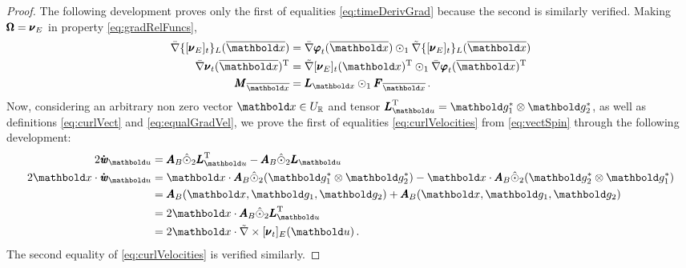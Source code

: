 {\footnotesize
\begin{proof}
The following development proves only the first of equalities \eqref{eq:timeDerivGrad} because the second is similarly verified. Making $\pmb{\Omega}=\pmb{\nu}_E$ in property \eqref{eq:gradRelFuncs}, 
\begin{align*}
\bar{\nabla}\{[{\tnr{\nu}_E}]_{t}\}_L(\overline{\vto{x}})&=\bar{\nabla}{\tnr{\varphi}}_{t}(\overline{\vto{x}})\odot_1\tilde{\nabla}\{[{\tnr{\nu}_E}]_{t}\}_L(\overline{\vto{x}})\\
\bar{\nabla}{\tnr{\nu}}_{t}(\overline{\vto{x}})^\text{T}&=\tilde{\nabla}[\tnr{\nu}_E]_{t}({\vto{x}})^\text{T}\odot_1\bar{\nabla}{\tnr{\varphi}}_{t}(\overline{\vto{x}})^\text{T}\\
\tnr{M}_{\overline{\vto{x}}}&=\tnr{L}_{{\vto{x}}}\odot_1\tnr{F}_{\overline{\vto{x}}}\,.
\end{align*}
Now, considering an arbitrary non zero vector $\vto{x}\in U_\real$ and tensor ${\tnr{L}}_{{\vto{u}}}^{\text{T}}=\vto{g}_1^*\otimes\vto{g}_2^*$, as well as definitions \eqref{eq:curlVect} and \eqref{eq:equalGradVel}, we prove the first of equalities \eqref{eq:curlVelocities} from \eqref{eq:vectSpin} through the following development:
\begin{align*}
2\tnr{\dot{\mathit{w}}}_{{\vto{u}}} &=\tnr{A}_B\hat{\odot}_2{\tnr{L}}_{{\vto{u}}}^{\text{T}}-\tnr{A}_B\hat{\odot}_2{\tnr{L}}_{{\vto{u}}}\\
2\vto{x}\cdot\tnr{\dot{\mathit{w}}}_{{\vto{u}}}&=\vto{x}\cdot\tnr{A}_B\hat{\odot}_2(\vto{g}_1^*\otimes\vto{g}_2^*) - \vto{x}\cdot\tnr{A}_B\hat{\odot}_2(\vto{g}_2^*\otimes\vto{g}_1^*)\\
&=\tnr{A}_B(\vto{x},\vto{g}_1,\vto{g}_2) + \tnr{A}_B(\vto{x},\vto{g}_1,\vto{g}_2)\\
&=2\vto{x}\cdot\tnr{A}_B\hat{\odot}_2{\tnr{L}}_{{\vto{u}}}^{\text{T}}\\
&=2\vto{x}\cdot\tilde{\nabla}\times\fua{[\tnr{\nu}_t]_E}{{\vto{u}}}\,.
\end{align*}
The second equality of \eqref{eq:curlVelocities} is verified similarly.
\end{proof}
}


